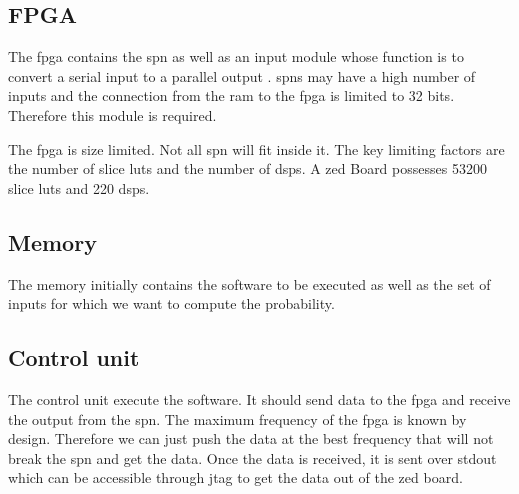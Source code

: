 \subsection{FPGA}
The \gls{fpga} contains the \gls{spn} as well as an input module whose function is to convert a serial input to a parallel output . \Glspl{spn} may have a high number of inputs and the connection from the \gls{ram} to the \gls{fpga} is limited to 32 bits. Therefore this module is required.

The \gls{fpga} is size limited. Not all \gls{spn} will fit inside it. The key limiting factors are the number of slice \glspl{lut} and the number of \glspl{dsp}. A zed Board possesses 53200 slice \glspl{lut} and 220 \glspl{dsp}. 

\subsection{Memory}
The memory initially contains the software to be executed as well as the set of inputs for which we want to compute the probability.

\subsection{Control unit}
The control unit execute the software. It should send data to the \gls{fpga} and receive the output from the \gls{spn}. The maximum frequency of the \gls{fpga} is known by design. Therefore we can just push the data at the best frequency that will not break the \gls{spn} and get the data. Once the data is received,  it is sent over stdout which can be accessible through \gls{jtag} to get the data out of the zed board.





